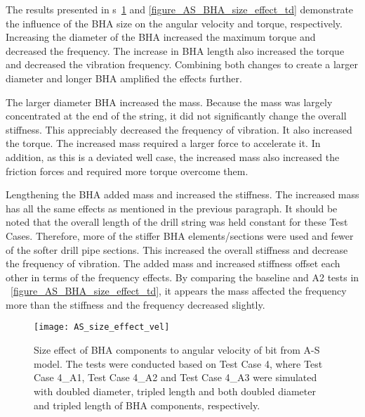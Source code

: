 The results presented in \figurename{}s~\ref{figure_AS_BHA_size_effect_vel} and \ref{figure_AS_BHA_size_effect_td} demonstrate the influence of the BHA size on the angular velocity and torque, respectively. Increasing the diameter of the BHA increased the maximum torque and decreased the frequency.  The increase in BHA length also increased the torque and decreased the vibration frequency.  Combining both changes to create a larger diameter and longer BHA amplified the effects further.

The larger diameter BHA increased the mass.  Because the mass was largely concentrated at the end of the string, it did not significantly change the overall stiffness.  This appreciably decreased the frequency of vibration.  It also increased the torque.  The increased mass required a larger force to accelerate it.  In addition, as this is a deviated well case, the increased mass also increased the friction forces and required more torque overcome them.

Lengthening the BHA added mass and increased the stiffness.  The increased mass has all the same effects as mentioned in the previous paragraph.  It should be noted that the overall length of the drill string was held constant for these Test Cases.  Therefore, more of the stiffer BHA elements/sections were used and fewer of the softer drill pipe sections.  This increased the overall stiffness and decrease the frequency of vibration.  The added mass and increased stiffness offset each other in terms of the frequency effects.  By comparing the baseline and A2 tests in \figurename{}~\ref{figure_AS_BHA_size_effect_td}, it appears the mass affected the frequency more than the stiffness and the frequency decreased slightly.

\begin{figure}
	\centering
	\texttt{[image: AS\_size\_effect\_vel]}
    \caption[Size effect of BHA components to angular velocity from A-S model]{Size effect of BHA components to angular velocity of bit from A-S model. The tests were conducted based on Test Case 4, where Test Case 4\_A1, Test Case 4\_A2 and Test Case 4\_A3 were simulated with doubled diameter, tripled length and both doubled diameter and tripled length of BHA components, respectively.}
	\label{figure_AS_BHA_size_effect_vel}
\end{figure}

